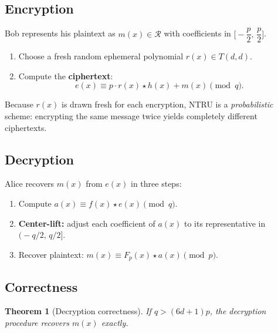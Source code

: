 \documentclass[12pt, a4paper]{article}
\theoremstyle{definition}
\theoremstyle{plain}
\newtheorem{theorem}{Theorem}[section]
\newcommand{\R}{\mathcal{R}}
\begin{document}
\subsection{Encryption}

Bob represents his plaintext as $m(x) \in \R$ with coefficients in
$\bigl[-\dfrac{p}{2},\, \dfrac{p}{2}\bigr]$.
\begin{enumerate}
    \item Choose a fresh random ephemeral polynomial $r(x) \in T(d, d)$.
    \item Compute the \textbf{ciphertext}:
          \[
              e(x) \equiv p \cdot r(x) \star h(x) + m(x) \pmod{q}.
          \]
\end{enumerate}

Because $r(x)$ is drawn fresh for each encryption, NTRU is a \textit{probabilistic} scheme: encrypting the same message twice yields completely different ciphertexts.

\subsection{Decryption}

Alice recovers $m(x)$ from $e(x)$ in three steps:
\begin{enumerate}
    \item Compute $a(x) \equiv f(x) \star e(x) \pmod{q}$.
    \item \textbf{Center-lift:} adjust each coefficient of $a(x)$ to its
          representative in $\bigl(-q/2,\, q/2\bigr]$.
    \item Recover plaintext: $m(x) \equiv F_p(x) \star a(x) \pmod{p}$.
\end{enumerate}

\subsection{Correctness}\label{sec:correctness}

\begin{theorem}[Decryption correctness]\label{thm:correctness}
    If $q > (6d+1)p$, the decryption procedure recovers $m(x)$ exactly.
\end{theorem}
\end{document}
